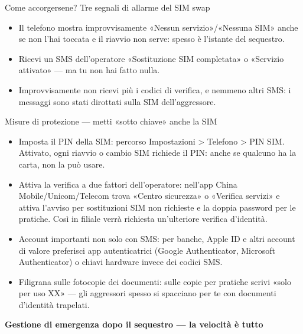 \begin{tcbinfo}{Come accorgersene? Tre segnali di allarme del SIM swap}
\begin{itemize}
  \item Il telefono mostra improvvisamente «Nessun servizio»/«Nessuna SIM» anche se non l'hai toccata e il riavvio non serve: spesso è l'istante del sequestro.
  \item Ricevi un SMS dell'operatore «Sostituzione SIM completata» o «Servizio attivato» — ma tu non hai fatto nulla.
  \item Improvvisamente non ricevi più i codici di verifica, e nemmeno altri SMS: i messaggi sono stati dirottati sulla SIM dell'aggressore.
\end{itemize}

\end{tcbinfo}

\begin{tcbwarn}{Misure di protezione — metti «sotto chiave» anche la SIM}
\begin{itemize}
  \item Imposta il PIN della SIM: percorso Impostazioni > Telefono > PIN SIM. Attivato, ogni riavvio o cambio SIM richiede il PIN: anche se qualcuno ha la carta, non la può usare.
  \item Attiva la verifica a due fattori dell'operatore: nell'app China Mobile/Unicom/Telecom trova «Centro sicurezza» o «Verifica servizi» e attiva l'avviso per sostituzioni SIM non richieste e la doppia password per le pratiche. Così in filiale verrà richiesta un'ulteriore verifica d'identità.
  \item Account importanti non solo con SMS: per banche, Apple ID e altri account di valore preferisci app autenticatrici (Google Authenticator, Microsoft Authenticator) o chiavi hardware invece dei codici SMS.
  \item Filigrana sulle fotocopie dei documenti: sulle copie per pratiche scrivi «solo per uso XX» — gli aggressori spesso si spacciano per te con documenti d'identità trapelati.
\end{itemize}

\end{tcbwarn}

\textbf{Gestione di emergenza dopo il sequestro — la velocità è tutto}\par

